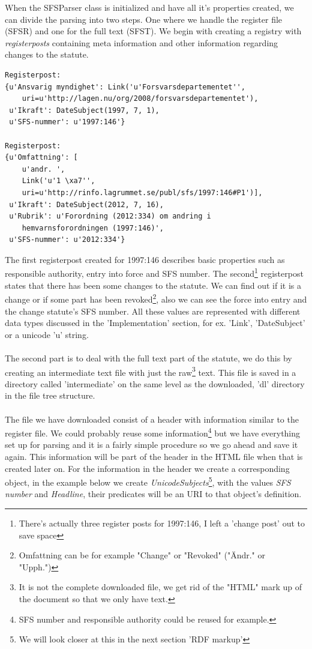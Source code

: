 When the SFSParser class is initialized and have all it’s properties created, we can divide the parsing into two steps. One where we handle the register file (SFSR) and one for the full text (SFST). We begin with creating a registry with \textit{registerposts} containing meta information and other information regarding changes to the statute.\\ 
\begin{verbatim}
Registerpost: 
{u'Ansvarig myndighet': Link('u'Forsvarsdepartementet'',
	uri=u'http://lagen.nu/org/2008/forsvarsdepartementet'), 
 u'Ikraft': DateSubject(1997, 7, 1), 
 u'SFS-nummer': u'1997:146'}

Registerpost: 
{u'Omfattning': [
	u'andr. ', 
	Link('u'1 \xa7'',
	uri=u'http://rinfo.lagrummet.se/publ/sfs/1997:146#P1')],
 u'Ikraft': DateSubject(2012, 7, 16), 
 u'Rubrik': u'Forordning (2012:334) om andring i 
	hemvarnsforordningen (1997:146)', 
 u'SFS-nummer': u'2012:334'}
\end{verbatim}
\linebreak
\newline
The first registerpost created for 1997:146 describes basic properties such as responsible authority, entry into force and SFS number. The second\footnote{There's actually three register posts for 1997:146, I left a 'change post' out to save space} registerpost states that there has been some changes to the statute. We can find out if it is a change or if some part has been revoked\footnote{Omfattning can be for example "Change" or "Revoked" ("Ändr." or "Upph.")}, also we can see the force into entry and the change statute's SFS number. All these values are represented with different data types discussed in the 'Implementation' section, for ex. 'Link', 'DateSubject' or a unicode 'u' string.\\\\
The second part is to deal with the full text part of the statute, we do this by creating an intermediate text file with just the raw\footnote{It is not the complete downloaded file, we get rid of the "HTML" mark up of the document so that we only have text.} text. This file is saved in a directory called 'intermediate' on the same level as the downloaded, 'dl' directory in the file tree structure. \\\\ 
The file we have downloaded consist of a header with information similar to the register file. We could probably reuse some information\footnote{SFS number and responsible authority could be reused for example.} but we have everything set up for parsing and it is a fairly simple procedure so we go ahead and save it again. This information will be part of the header in the HTML file when that is created later on. For the information in the header we create a corresponding object, in the example below we create \textit{UnicodeSubjects}\footnote{We will look closer at this in the next section 'RDF markup'}, with the values \textit{SFS number} and \textit{Headline}, their predicates will be an URI to that object's definition.\\
